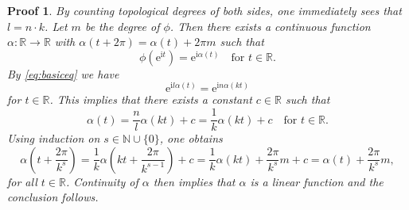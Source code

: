 \documentclass[10pt,a4paper]{amsart}
\newtheorem{pf}{Proof}
\newcommand{\D}{\mathbb{D}}
\newcommand{\N}{\mathbb{N}}
\newcommand{\R}{\mathbb{R}}
\newcommand{\co}{\colon}
\newcommand{\ra}{\rightarrow}
\begin{document}
\begin{pf} By counting topological degrees of both sides, one immediately sees that 
$l=n\cdot k$. 
Let $m$ be the degree of $\phi$. Then there exists a continuous function $\alpha\co \R \ra \R$ with $\alpha(t+2\pi)=\alpha(t)+2\pi m$ such that
$$ \phi(\mathrm{e}^{ \mathrm{i} t}) = \mathrm{e}^{ \mathrm{i}\alpha(t)} \quad \text{for  $t\in \R$}. $$
By  \eqref{eq:basiceq} we have 
$$ \mathrm{e}^{ \mathrm{i} l \alpha(t)} = \mathrm{e}^{ \mathrm{i} n\alpha(kt)}$$
for $t\in \R$. This implies that there exists a constant $c\in \R$ such that 
$$ \alpha(t)=\frac{n}{l}\alpha(kt)+c=\frac 1k \alpha(kt)+c  \quad \text{for  $t\in \R$}. $$
Using induction on $s\in\N\cup\{0\}$, one obtains
$$ \alpha\left(t+\frac{2\pi}{k^s}\right)=\frac 1k \alpha\left(kt+\frac{2\pi}{k^{s-1}}\right)+c=\frac 1k \alpha(kt)+\frac{2\pi}{k^s}m+c=\alpha(t)+\frac{2\pi}{k^s}m,$$  for all $t\in\R$.
Continuity of $\alpha$ then implies that $\alpha$ is a linear function and the conclusion follows.
\end{pf}
\end{document}
